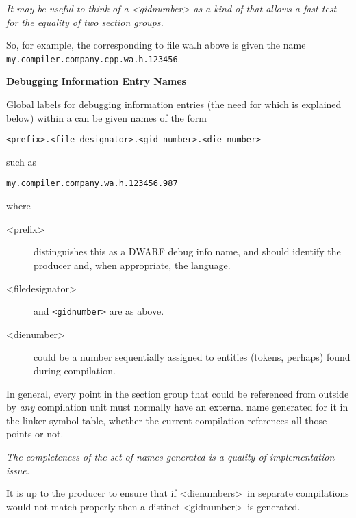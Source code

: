 \textit{It may be useful to think of a 
\textless gid\dash number\textgreater
as a kind
of  that allows a fast test for the
equality of two 
section groups.}

So, for example, the  
corresponding to file wa.h
above is given the name \texttt{my.compiler.company.cpp.wa.h.123456}.


\textbf{Debugging Information Entry Names}

Global labels for 
debugging information entries (the need for which is explained
below) within a 
can be given names of the form

\begin{alltt}
    <prefix>.<file-designator>.<gid-number>.<die-number>
\end{alltt}

such as

\begin{alltt}
    my.compiler.company.wa.h.123456.987
\end{alltt}

where
\begin{description}
\item [\textless prefix\textgreater]  
distinguishes this as a DWARF debug info name, and should identify the producer
and, when appropriate, the language.
\item [\textless file\dash designator\textgreater]  
and 
\texttt{\textless gid\dash number\textgreater} 
are as above.

\item  [\textless die\dash number\textgreater]
could be a number sequentially assigned 
to entities (tokens, perhaps) found
during compilation.

\end{description}

In general, every point in the 
section group 
\dotdebuginfo{} that
could be referenced from outside by \emph{any} compilation unit must
normally have an external name generated for it in the linker
symbol table, whether the current compilation references all
those points or not.

\textit{The completeness of the set of names generated is a
quality-of-implementation issue.}

It is up to the producer to ensure that if 
\textless die\dash numbers\textgreater\ 
in separate compilations would not match properly then a
distinct 
\textless gid\dash number\textgreater\ 
is generated.

